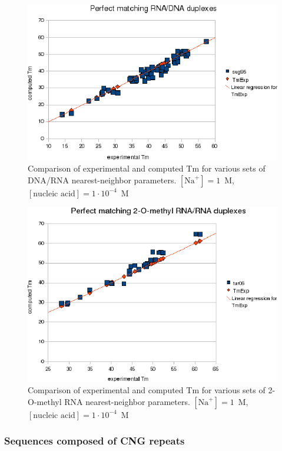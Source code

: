 \documentclass{article}
\begin{document}
\begin{figure}[h!]
\includegraphics[width=1\linewidth]{images/DNARNA}
\caption{Comparison of experimental and computed Tm for various sets of
  DNA/RNA nearest-neighbor parameters. $[\mbox{Na}^+] = 1$~M, $[\mbox{nucleic acid}] = 1\cdot{}10^{-4}$~M}
\end{figure} 

\begin{figure}[h!]
\includegraphics[width=1\linewidth]{images/mRNARNA}
\caption{Comparison of experimental and computed Tm for various sets of
  2-O-methyl RNA nearest-neighbor parameters. $[\mbox{Na}^+] = 1$~M, $[\mbox{nucleic acid}] = 1\cdot{}10^{-4}$~M}
\end{figure}

\pagebreak
\clearpage
\subsubsection{Sequences composed of CNG repeats}
\end{document}
